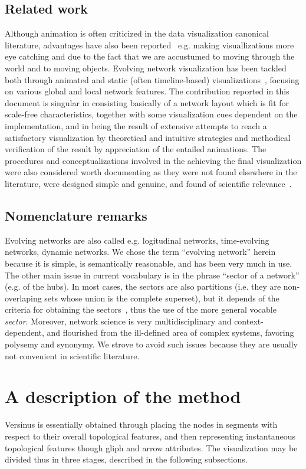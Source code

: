 \documentclass[runningheads]{llncs}
\begin{document}
\subsection{Related work}
Although animation is often criticized in the data visualization canonical literature, advantages have also been reported~\cite{anim,munzner,cog,ware} e.g. making visuallizations more eye catching and due to the fact that we are accustumed to moving through the world and to moving objects.
Evolving network visualization has been tackled both through animated and static (often timeline-based) visualizations~\cite{ego,brain,visAn}, focusing on various global and local network features.
The contribution reported in this document is singular in consisting basically of a network layout which is fit for scale-free characteristics, together with some visualization cues dependent on the implementation, and in being the result of extensive attempts to reach a satisfactory visualization by theoretical and intuitive strategies and methodical verification of the result by appreciation of the entailed animations.
The procedures and conceptualizations involved in the achieving the final visualization were also considered worth documenting as they were not found elsewhere in the literature, were designed simple and genuine, and found of scientific relevance~\cite{stab}.

\subsection{Nomenclature remarks}
Evolving networks are also called e.g. logitudinal networks, time-evolving networks, dynamic networks.
We chose the term ``evolving network'' herein because it is simple, is semantically reasonable, and has been very much in use.
The other main issue in current vocabulary is in the phrase ``sector of a network'' (e.g. of the hubs). In most cases, the sectors are also partitions (i.e. they are non-overlaping sets whose union is the complete superset), but it depends of the criteria for obtaining the sectors~\cite{stab}, thus the use of the more general vocable \emph{sector}.
Moreover, network science is very multidisciplinary and context-dependent, and flourished from the ill-defined area of complex systems, favoring polysemy and synonymy. We strove to avoid such issues because they are usually not convenient in scientific literature.

\section{A description of the method}\label{sec:des}
Versinus is essentially obtained through placing the nodes in segments
with respect to their overall topological features, and then representing
instantaneous topological features though gliph and arrow attributes.
The visualization may be divided thus in three stages, described in the following subsections.
\end{document}
